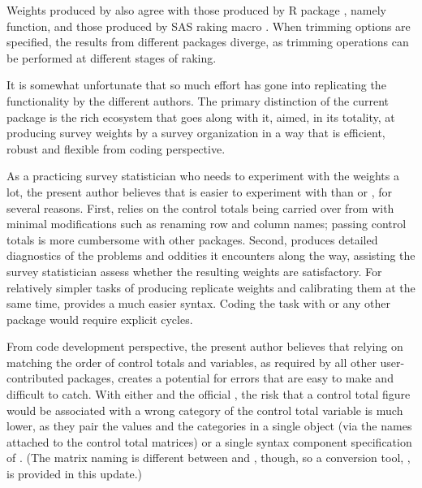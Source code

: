 \begin{stlog}
\nullskip
\end{stlog}


Weights produced by  also agree with those produced by R package
 \citep{lumley:2018:svy334}, 
namely  function,
and those produced by SAS raking macro 
\citep{izrael:batt:batt:ball:2017}. When trimming options are specified,
the results from different packages diverge, as trimming operations can be 
performed at different stages of raking.

It is somewhat unfortunate that so much effort has gone into replicating
the functionality by the different authors. The primary distinction of the current
 package is the rich ecosystem that goes along with it, aimed,
in its totality, at producing survey weights by a survey organization in
a way that is efficient, robust and flexible from coding perspective.

As a practicing survey statistician who needs to experiment
with the weights a lot, the present author believes that 
is easier to experiment with than  or , for several reasons.
First,  relies on the control totals being carried over from 
with minimal modifications such as renaming row and column names;
passing control totals is more cumbersome with other packages.
Second,  produces detailed diagnostics of the problems and oddities
it encounters along the way, assisting the survey statistician assess whether
the resulting weights are satisfactory. For relatively simpler tasks of producing
replicate weights and calibrating them at the same time,  provides
a much easier syntax. Coding the task with  or any other package would
require explicit cycles.

From code development perspective, the present author believes that relying
on matching the order of control
totals and variables, as required by all other user-contributed packages,
creates a potential for errors that are easy to make and difficult to catch.
With either  and the official , the risk
that a control total figure would be associated with a wrong category of the control
total variable is much lower, as they pair the values and the categories
in a single object (via the names attached to the control total matrices)
or a single syntax component  specification
of .
(The matrix naming is different between  and , though,
so a conversion tool, , is provided in this update.)

